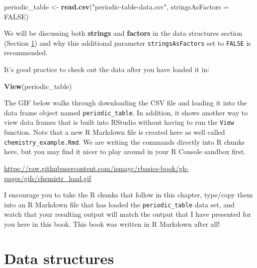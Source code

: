 \documentclass[]{tufte-book}
\newenvironment{Shaded}{\begin{snugshade}}{\end{snugshade}}
\newcommand{\KeywordTok}[1]{\textcolor[rgb]{0.13,0.29,0.53}{\textbf{{#1}}}}
\newcommand{\DataTypeTok}[1]{\textcolor[rgb]{0.13,0.29,0.53}{{#1}}}
\newcommand{\StringTok}[1]{\textcolor[rgb]{0.31,0.60,0.02}{{#1}}}
\newcommand{\OtherTok}[1]{\textcolor[rgb]{0.56,0.35,0.01}{{#1}}}
\newcommand{\NormalTok}[1]{{#1}}
\begin{document}
\begin{Shaded}
\begin{Highlighting}[]
\NormalTok{periodic_table <-}\StringTok{ }\KeywordTok{read.csv}\NormalTok{(}\StringTok{"periodic-table-data.csv"}\NormalTok{,}
                           \DataTypeTok{stringsAsFactors =} \OtherTok{FALSE}\NormalTok{)}
\end{Highlighting}
\end{Shaded}

We will be discussing both \textbf{strings} and \textbf{factors} in the
data structures section (Section \ref{data-structures}) and why this
additional parameter \texttt{stringsAsFactors} set to \texttt{FALSE} is
recommended.

It's good practice to check out the data after you have loaded it in:

\begin{Shaded}
\begin{Highlighting}[]
\KeywordTok{View}\NormalTok{(periodic_table)}
\end{Highlighting}
\end{Shaded}

The GIF below walks through downloading the CSV file and loading it into
the data frame object named \texttt{periodic\_table}. In addition, it
shows another way to view data frames that is built into RStudio without
having to run the \texttt{View} function. Note that a new R Markdown
file is created here as well called \texttt{chemistry\_example.Rmd}. We
are writing the commands directly into R chunks here, but you may find
it nicer to play around in your R Console sandbox first.

\vspace{0.1in}

\begin{center}\footnotesize{\url{https://raw.githubusercontent.com/ismayc/rbasics-book/gh-pages/gifs/chemistr_load.gif}}\end{center}

\vspace{0.1in}

I encourage you to take the R chunks that follow in this chapter,
type/copy them into an R Markdown file that has loaded the
\texttt{periodic\_table} data set, and watch that your resulting output
will match the output that I have presented for you here in this book.
This book was written in R Markdown after all!

\section{Data structures}\label{data-structures}
\end{document}
